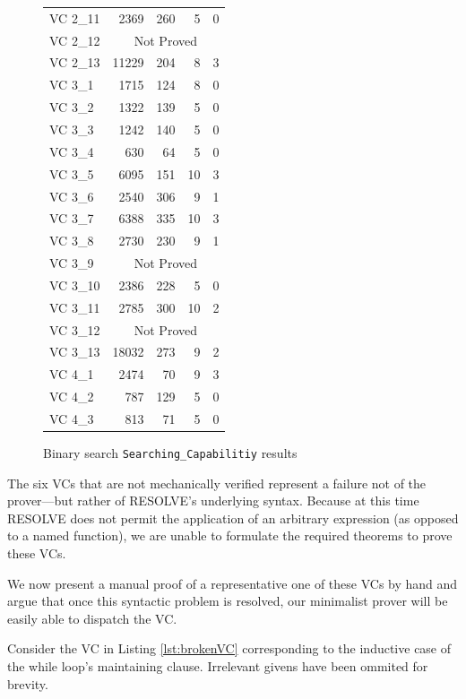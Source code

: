 \begin{figure}
\begin{tabular}{lrrrr}
		VC 2\_11 & 2369		& 260	& 5 	& 0     \\
		VC 2\_12 & \multicolumn{4}{c}{Not Proved}       \\
		VC 2\_13 & 11229	& 204	& 8	& 3     \\
		VC 3\_1	& 1715		& 124	& 8 	& 0     \\
		VC 3\_2	& 1322		& 139	& 5	& 0     \\
		VC 3\_3	& 1242		& 140	& 5 	& 0     \\
		VC 3\_4	& 630		& 64	& 5 	& 0     \\
		VC 3\_5	& 6095		& 151	& 10	& 3     \\
		VC 3\_6	& 2540		& 306	& 9	& 1     \\
		VC 3\_7	& 6388 		& 335	& 10	& 3     \\
		VC 3\_8	& 2730 		& 230	& 9	& 1     \\
		VC 3\_9	& \multicolumn{4}{c}{Not Proved}        \\
		VC 3\_10 & 2386		& 228	& 5 	& 0     \\
		VC 3\_11 & 2785		& 300	& 10	& 2     \\
		VC 3\_12 & \multicolumn{4}{c}{Not Proved}       \\
		VC 3\_13 & 18032	& 273	& 9	& 2     \\
		VC 4\_1	& 2474		& 70	& 9 	& 3     \\
		VC 4\_2	& 787		& 129	& 5	& 0     \\
		VC 4\_3	& 813		& 71	& 5 	& 0     \\
		\bottomrule
	\end{tabular}
	\caption{Binary search \texttt{Searching\_Capabilitiy} results\label{fig:binSearchResults}}
\end{figure}

The six VCs that are not mechanically verified represent a failure not of the prover---but rather of RESOLVE's underlying syntax.  Because at this time RESOLVE does not permit the application of an arbitrary expression (as opposed to a named function), we are unable to formulate the required theorems to prove these VCs.

We now present a manual proof of a representative one of these VCs by hand and argue that once this syntactic problem is resolved, our minimalist prover will be easily able to dispatch the VC.

Consider the VC in Listing \ref{lst:brokenVC} corresponding to the inductive case of the while loop's maintaining clause.  Irrelevant givens have been ommited for brevity.

